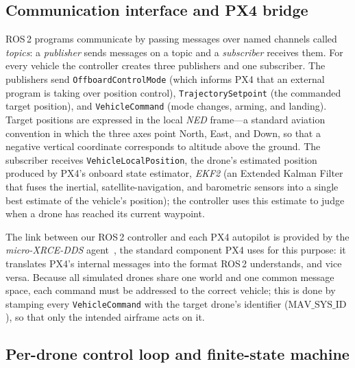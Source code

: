 \documentclass[subscriptcorrection,upint,nolists, varvw,barcolor=Goldenrod3,mathalfa=cal=euler,balance,hyphenate,french]{asmejour} %
\begin{document}
\subsection{Communication interface and PX4 bridge}

ROS\,2 programs communicate by passing messages over named channels called \emph{topics}: a \emph{publisher} sends messages on a topic and a \emph{subscriber} receives them. For every vehicle the controller creates three publishers and one subscriber. The publishers send \texttt{OffboardControlMode} (which informs PX4 that an external program is taking over position control), \texttt{TrajectorySetpoint} (the commanded target position), and \texttt{VehicleCommand} (mode changes, arming, and landing). Target positions are expressed in the local \emph{NED} frame---a standard aviation convention in which the three axes point North, East, and Down, so that a negative vertical coordinate corresponds to altitude above the ground. The subscriber receives \texttt{VehicleLocalPosition}, the drone's estimated position produced by PX4's onboard state estimator, \emph{EKF2} (an Extended Kalman Filter that fuses the inertial, satellite-navigation, and barometric sensors into a single best estimate of the vehicle's position); the controller uses this estimate to judge when a drone has reached its current waypoint.

The link between our ROS\,2 controller and each PX4 autopilot is provided by the \emph{micro-XRCE-DDS} agent~\cite{eProsimaMicroXRCEDDS}, the standard component PX4 uses for this purpose: it translates PX4's internal messages into the format ROS\,2 understands, and vice versa. Because all simulated drones share one world and one common message space, each command must be addressed to the correct vehicle; this is done by stamping every \texttt{VehicleCommand} with the target drone's identifier ($\text{MAV\_SYS\_ID}$), so that only the intended airframe acts on it.

\subsection{Per-drone control loop and finite-state machine}
\end{document}
